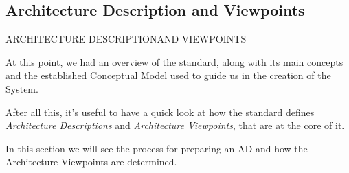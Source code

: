 		\subsection{Architecture Description and Viewpoints}
		
		\begin{frame}
			\begin{center}
				\begin{LARGE}
					ARCHITECTURE DESCRIPTION\newline\newline AND VIEWPOINTS
				\end{LARGE}
			\end{center}
		\end{frame}
				
		
		\begin{frame}
		
		At this point, we had an overview of the standard, along with its main concepts and the established Conceptual Model used to guide us in the creation of the System.
		\newline\newline
		
		After all this, it's useful to have a quick look at how the standard defines \emph{Architecture Descriptions} and \emph{Architecture Viewpoints}, that are at the core of it.\newline\newline
		
		In this section we will see the process for preparing an AD and how the Architecture Viewpoints are determined.
		
		\end{frame}
		

